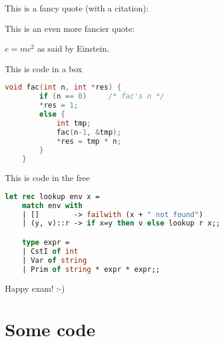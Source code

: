 \documentclass{ituhandin}
\begin{document}
%
\maketitlepage
\signpage

\question{}

This is a fancy quote (with a citation):

This is an even more fancier quote:

$e=mc^2$ as said by Einstein\cite{einstein}.

This is code in a box

\begin{lstlisting}[language=C, caption=This is a caption]
    void fac(int n, int *res) {
        if (n == 0)     /* fac's n */
        *res = 1;
        else {
            int tmp;
            fac(n-1, &tmp);
            *res = tmp * n;
        }
    }
\end{lstlisting}


This is code in the free

\begin{lstlisting}[language=ML, frame={}]
    let rec lookup env x =
    match env with 
    | []        -> failwith (x + " not found")
    | (y, v)::r -> if x=y then v else lookup r x;;

    type expr = 
    | CstI of int
    | Var of string
    | Prim of string * expr * expr;;
\end{lstlisting}


Happy exam! :-)


\question{}
\section{}
\section{}




\styleAppendix
\appendix
\chapter{Some code}

\label{LastPage}
\end{document}
